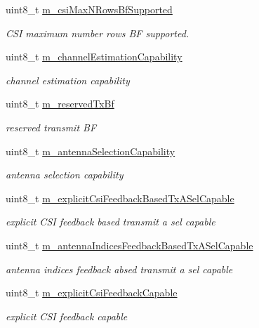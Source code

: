 \begin{DoxyCompactItemize}
uint8\+\_\+t \hyperlink{classns3_1_1HtCapabilities_a69916bbb030d4c5e9f434e19551bc784}{m\+\_\+csi\+Max\+N\+Rows\+Bf\+Supported}
\begin{DoxyCompactList}\small\item\em C\+SI maximum number rows BF supported. \end{DoxyCompactList}\item 
uint8\+\_\+t \hyperlink{classns3_1_1HtCapabilities_ab3ba104365acd7bbe1e9596aaea16bbe}{m\+\_\+channel\+Estimation\+Capability}
\begin{DoxyCompactList}\small\item\em channel estimation capability \end{DoxyCompactList}\item 
uint8\+\_\+t \hyperlink{classns3_1_1HtCapabilities_a292c85ad03ad15416f0256a660e972e3}{m\+\_\+reserved\+Tx\+Bf}
\begin{DoxyCompactList}\small\item\em reserved transmit BF \end{DoxyCompactList}\item 
uint8\+\_\+t \hyperlink{classns3_1_1HtCapabilities_ac03df8c351fc6f4f3d79264dca618f9e}{m\+\_\+antenna\+Selection\+Capability}
\begin{DoxyCompactList}\small\item\em antenna selection capability \end{DoxyCompactList}\item 
uint8\+\_\+t \hyperlink{classns3_1_1HtCapabilities_aefb68d446386993483837d8a19c0b0c9}{m\+\_\+explicit\+Csi\+Feedback\+Based\+Tx\+A\+Sel\+Capable}
\begin{DoxyCompactList}\small\item\em explicit C\+SI feedback based transmit a sel capable \end{DoxyCompactList}\item 
uint8\+\_\+t \hyperlink{classns3_1_1HtCapabilities_a9fa856caa8eb4f176911a6ee63794812}{m\+\_\+antenna\+Indices\+Feedback\+Based\+Tx\+A\+Sel\+Capable}
\begin{DoxyCompactList}\small\item\em antenna indices feedback absed transmit a sel capable \end{DoxyCompactList}\item 
uint8\+\_\+t \hyperlink{classns3_1_1HtCapabilities_a8b43df792adaaaf96c9234a9fe9ab0a2}{m\+\_\+explicit\+Csi\+Feedback\+Capable}
\begin{DoxyCompactList}\small\item\em explicit C\+SI feedback capable \end{DoxyCompactList}\item 

\end{DoxyCompactItemize}
